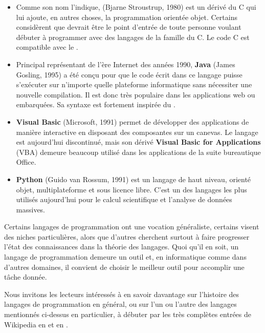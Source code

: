 \begin{itemize}
\item Comme son nom l'indique, \textbf{\Cpp} (Bjarne
  Stroustrup, 1980) est un dérivé du C qui lui ajoute, en autres
  choses, la programmation orientée objet. Certains considèrent que
  {\Cpp} devrait être le point d'entrée de toute personne voulant
  débuter à programmer avec des langages de la famille du C. Le code C
  est compatible avec le \Cpp.
\item Principal représentant de l'ère Internet des années 1990,
  \textbf{Java} (James Gosling, 1995) a été conçu pour
  que le code écrit dans ce langage puisse s'exécuter sur n'importe
  quelle plateforme informatique sans nécessiter une nouvelle
  compilation. Il est donc très populaire dans les applications web ou
  embarquées. Sa syntaxe est fortement inspirée du \Cpp.
\item {}\textbf{Visual Basic} (Microsoft, 1991) permet de développer des
  applications de manière interactive en disposant des composantes sur
  un canevas. Le langage est aujourd'hui discontinué, mais son dérivé
  \textbf{Visual Basic for Applications} (VBA) demeure beaucoup
  utilisé dans les applications de la suite bureautique Office.
\item {}\textbf{Python} (Guido van Rossum, 1991) est un
  langage de haut niveau, orienté objet, multiplateforme et sous
  licence libre. C'est un des langages les plus utilisés aujourd'hui
  pour le calcul scientifique et l'analyse de données massives.
\end{itemize}

Certains langages de programmation ont une vocation généraliste,
certains visent des niches particulières, alors que d'autres cherchent
surtout à faire progresser l'état des connaissances dans la théorie
des langages. Quoi qu'il en soit, un langage de programmation demeure
un outil et, en informatique comme dans d'autres domaines, il convient
de choisir le meilleur outil pour accomplir une tâche donnée.

Nous invitons les lecteurs intéressés à en savoir davantage sur
l'histoire des langages de programmation en général, ou sur l'un ou
l'autre des langages mentionnés ci-dessus en particulier, à débuter
par les très complètes entrées de Wikipedia en
et en
.


